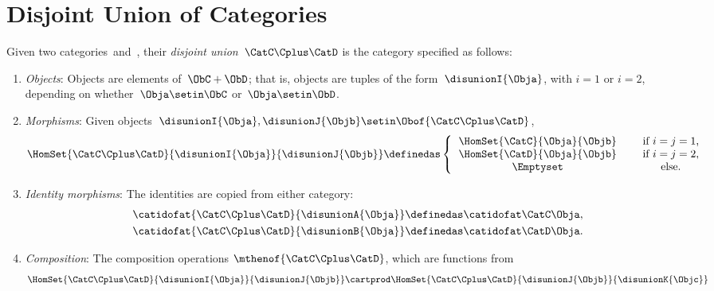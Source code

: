 
\section{Disjoint Union of Categories}

\begin{ctdefinition}
    \label{def:disjoint-union-category}
    Given two categories~\CatC and~\CatD, their \emph{disjoint union}~$\CatC\Cplus\CatD$ is the category specified as follows:
    \begin{enumerate}
        \item \emph{Objects}: Objects are elements of~$\ObC + \ObD$; that is, objects are tuples of the form~$\disunionI{\Obja}$, with $i=1$ or $i=2$, depending on whether~$\Obja \setin \ObC$ or~$\Obja \setin \ObD$.
        \item \emph{Morphisms}: Given objects~$\disunionI{\Obja}, \disunionJ{\Objb} \setin \Obof{\CatC\Cplus\CatD}$,
              \begin{equation}
                  \HomSet{\CatC\Cplus\CatD}{\disunionI{\Obja}}{\disunionJ{\Objb}} \definedas
                  \left\{
                  \begin{tabular}{ccc}
                      $\HomSet{\CatC}{\Obja}{\Objb}$ &  & if $i=j = 1$, \\
                      $\HomSet{\CatD}{\Obja}{\Objb}$ &  & if $i = j =2$, \\
                      $\Emptyset$                    &  & else.
                  \end{tabular}
                  \right.{}
              \end{equation}
        \item \emph{Identity morphisms}: The identities  are copied from either category:
              \begin{align}
                  \catidofat{\CatC\Cplus\CatD}{\disunionA{\Obja}} &\definedas \catidofat\CatC\Obja, \\
                  \catidofat{\CatC\Cplus\CatD}{\disunionB{\Obja}} &\definedas \catidofat\CatD\Obja.
              \end{align}
        \item \emph{Composition}: The composition operations $\mthenof{\CatC\Cplus\CatD}$, which are functions from 
        $$
         \HomSet{\CatC\Cplus\CatD}{\disunionI{\Obja}}{\disunionJ{\Objb}} \cartprod \HomSet{\CatC\Cplus\CatD}{\disunionJ{\Objb}}{\disunionK{\Objc}} 
$$
\end{enumerate}
\end{ctdefinition}
